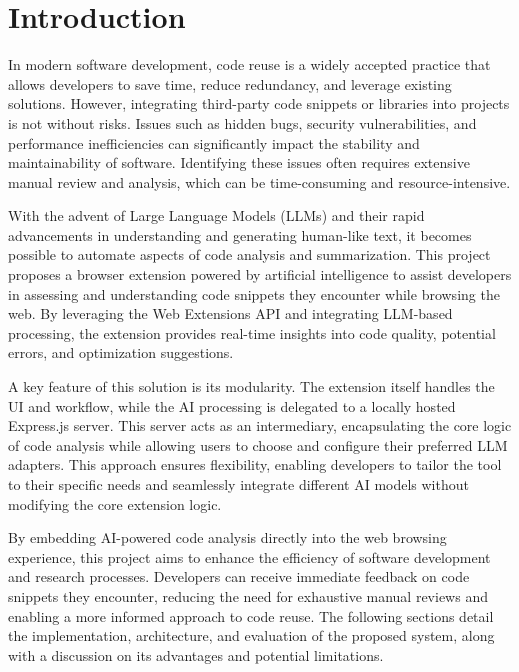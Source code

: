 \section{Introduction}

In modern software development, code reuse is a widely accepted practice that
allows developers to save time, reduce redundancy, and leverage existing solutions.
However, integrating third-party code snippets or libraries into projects is not
without risks. Issues such as hidden bugs, security vulnerabilities, and
performance inefficiencies can significantly impact the stability and
maintainability of software. Identifying these issues often requires extensive
manual review and analysis, which can be time-consuming and resource-intensive.

With the advent of Large Language Models (LLMs) and their rapid advancements in
understanding and generating human-like text, it becomes possible to automate
aspects of code analysis and summarization. This project proposes a browser
extension powered by artificial intelligence to assist developers in assessing
and understanding code snippets they encounter while browsing the web. By
leveraging the Web Extensions API \autocite{CFD} and integrating LLM-based
processing, the extension provides real-time insights into code quality,
potential errors, and optimization suggestions.

A key feature of this solution is its modularity. The extension itself handles
the UI and workflow, while the AI processing is delegated to a locally hosted
Express.js server. This server acts as an intermediary, encapsulating the core
logic of code analysis while allowing users to choose and configure their
preferred LLM adapters. This approach ensures flexibility, enabling developers
to tailor the tool to their specific needs and seamlessly integrate different
AI models without modifying the core extension logic.

By embedding AI-powered code analysis directly into the web browsing experience,
this project aims to enhance the efficiency of software development and research
processes. Developers can receive immediate feedback on code snippets they
encounter, reducing the need for exhaustive manual reviews and enabling a more
informed approach to code reuse. The following sections detail the
implementation, architecture, and evaluation of the proposed system, along with
a discussion on its advantages and potential limitations.
